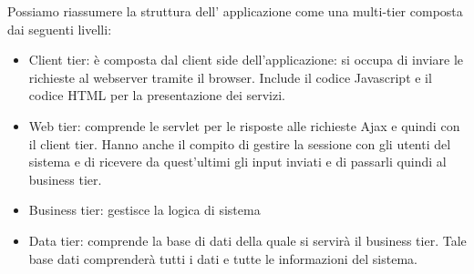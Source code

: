 Possiamo riassumere la struttura dell' applicazione come una multi-tier composta dai seguenti livelli:
\begin{itemize}
\item Client tier: è composta dal client side dell’applicazione: si occupa di inviare le richieste al webserver tramite il browser. Include il codice Javascript e il codice HTML per la presentazione dei servizi.
\item Web tier: comprende le servlet per le risposte alle richieste Ajax e quindi con il client tier. Hanno anche il compito di gestire la sessione con gli utenti del sistema e di ricevere da quest’ultimi gli input inviati e di passarli quindi al business tier.
\item Business tier: gestisce la logica di sistema
\item Data tier: comprende la base di dati della quale si servirà il business tier. Tale base dati comprenderà tutti i dati e tutte le informazioni del sistema.
\end{itemize}

